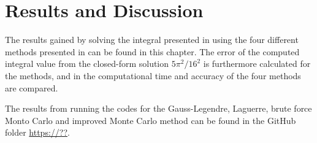 \chapter{Results and Discussion}
\label{chap:Results}
The results gained by solving the integral presented in  using the four different methods presented in  can be found in this chapter. 
The error of the computed integral value from the closed-form solution $5\pi ^2 / 16^2$ is furthermore calculated for the methods, and in  the computational time and accuracy of the four methods are compared.  

The results from running the codes for the Gauss-Legendre, Laguerre, brute force Monto Carlo and improved Monte Carlo method can be found in the GitHub folder  \url{https://??}.
